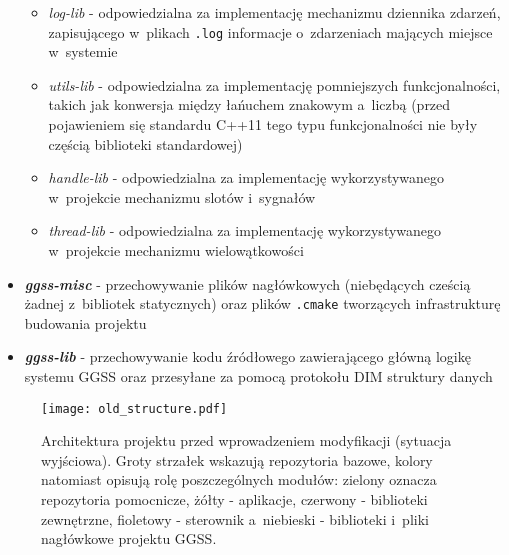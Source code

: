 \begin{itemize}
    \begin{itemize}
        \item \emph{log-lib} - odpowiedzialna za implementację mechanizmu dziennika zdarzeń, zapisującego w~plikach \lstinline{.log} informacje o~zdarzeniach mających miejsce w~systemie
        \item \emph{utils-lib} - odpowiedzialna za implementację pomniejszych funkcjonalności, takich jak konwersja między łańuchem znakowym a~liczbą (przed pojawieniem się standardu C++11 tego typu funkcjonalności nie były częścią biblioteki standardowej)
        \item \emph{handle-lib} - odpowiedzialna za implementację wykorzystywanego w~projekcie mechanizmu slotów i~sygnałów
        \item \emph{thread-lib} - odpowiedzialna za implementację wykorzystywanego w~projekcie mechanizmu wielowątkowości
    \end{itemize}
    \item \textbf{\emph{ggss-misc}} - przechowywanie plików nagłówkowych (niebędących cześcią żadnej z~bibliotek statycznych) oraz plików \lstinline{.cmake} tworzących infrastrukturę budowania projektu
    \item \textbf{\emph{ggss-lib}} - przechowywanie kodu źródłowego zawierającego główną logikę systemu GGSS oraz przesyłane za pomocą protokołu DIM struktury danych
\end{itemize}

\begin{figure}[H]
\centering
\texttt{[image: old\_structure.pdf]}
\caption{Architektura projektu przed wprowadzeniem modyfikacji (sytuacja wyjściowa). Groty strzałek wskazują repozytoria bazowe, kolory natomiast opisują rolę poszczególnych modułów: zielony oznacza repozytoria pomocnicze, żółty - aplikacje, czerwony - biblioteki zewnętrzne, fioletowy - sterownik a~niebieski - biblioteki i~pliki nagłówkowe projektu GGSS.}
\label{fig:old_structure}
\end{figure}

